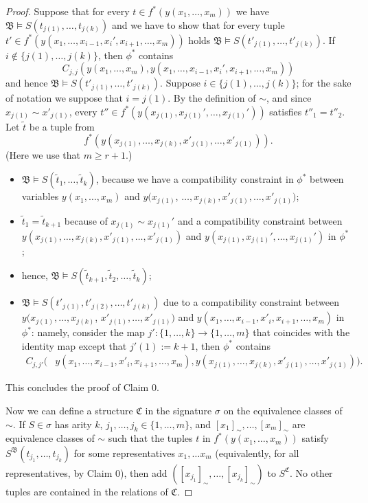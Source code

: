 \documentclass[10pt,a4paper]{amsart}
\newcommand{\bB}{{\mathfrak B}}
\newcommand{\bC}{{\mathfrak C}}
\begin{document}
\begin{proof}
Suppose that for every $t \in f^*(y(x_1,\dots,x_m))$ we have $\bB \models S(t_{j(1)},\dots,t_{j(k)})$ and we have to show that for every tuple $t' \in f^*(y(x_1,\dots,x_{i-1},x_i',x_{i+1},\dots,x_m))$ 
holds $\bB \models S(t'_{j(1)},\dots,t'_{j(k)})$. 
If $i \notin \{j(1),\dots,j(k)\}$, 
then $\phi^*$ contains $$C_{j,j}(y(x_1,\dots,x_m),y(x_1,\dots,x_{i-1},x_i',x_{i+1},\dots,x_m))$$
and hence 
$\bB \models S(t'_{j(1)},\dots,t'_{j(k)})$. 
Suppose $i \in \{j(1),\dots,j(k)\}$; for the sake of notation we suppose that $i=j(1)$. 
By the definition of $\sim$, and since $x_{j(1)} \sim x'_{j(1)}$, every 
 $t'' \in f^*(y(x_{j(1)},x_{j(1)}',\dots,x_{j(1)}'))$ satisfies $t''_1 = t''_2$. 
Let $\tilde t$ be a tuple from 
$$f^*(y(x_{j(1)},\dots,x_{j(k)},x'_{j(1)},\dots,x'_{j(1)})).$$  
(Here we use that $m \geq r+1$.)
\begin{itemize}
    \item $\bB \models S(\tilde t_{1},\dots,\tilde t_{k})$, because we have a compatibility constraint in $\phi^*$ between variables
$y(x_1,\dots,x_m)$ and $y(x_{j(1)}$,
$\dots,x_{j(k)},x'_{j(1)},\dots,x'_{j(1)})$; 
\item $\tilde t_1 = \tilde t_{k+1}$ because of $x_{j(1)}\sim x_{j(1)}'$  and a compatibility constraint between 
$y(x_{j(1)},\dots,x_{j(k)},x'_{j(1)},\dots,x'_{j(1)})$ and $y(x_{j(1)},x_{j(1)}',\dots,x_{j(1)}')$ 
in $\phi^*$; 
\item hence, $\bB \models S(\tilde t_{k+1},\tilde t_2,\dots,\tilde t_k)$; 
\item $\bB \models S(t'_{j(1)},t'_{j(2)},\dots,t'_{j(k)})$ 
due to a compatibility constraint between $y(x_{j(1)},\dots,x_{j(k)}$,
$x'_{j(1)},\dots,x'_{j(1)})$ and $y(x_1,\dots,x_{i-1},x'_i,x_{i+1},\dots,x_m)$
in $\phi^*$:
namely, consider the map $j' \colon \{1, \dots, k\} \to \{1, \dots, m \}$ that coincides with the identity map except that $j'(1) := k+1$, then $
\phi^*$ contains 
\begin{align*}
    C_{j,j'} \big (& y(x_1,\dots,x_{i-1},x'_{i},x_{i+1},\dots,x_m), y(x_{j(1)},\dots,x_{j(k)},x'_{j(1)},\dots,x'_{j(1)}) \big ).
\end{align*}
\end{itemize}

This concludes the proof of Claim 0. 

\medskip 

Now we can define a structure $\bC$ in the signature $\sigma$
on the equivalence classes of $\sim$. 
If $S \in \sigma$ has arity $k$, $j_1,\dots,j_k \in \{1,\dots,m\}$, and 
$[x_1]_\sim,\dots,[x_{m}]_\sim$ are equivalence classes of $\sim$ such that the tuples $t$ in $f^*(y(x_1,\dots,x_m))$ satisfy $S^{\bB}(t_{j_1},\dots,t_{j_k})$ for some representatives $x_1, \dots x_m$ (equivalently, for all representatives, by Claim 0), then add $([x_{j_1}]_\sim,\dots,[x_{j_k}]_\sim)$ to $S^{\bC}$.
No other tuples are contained in the relations of $\bC$.


\end{proof}
\end{document}
